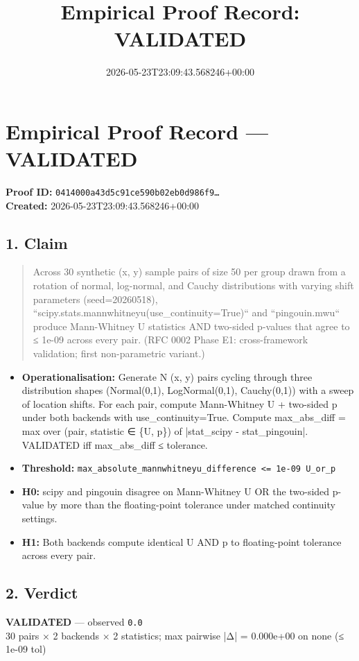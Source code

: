 \documentclass{article}
\title{Empirical Proof Record: VALIDATED}
\date{2026-05-23T23:09:43.568246+00:00}
\begin{document}
\maketitle
\section*{Empirical Proof Record --- \textcolor{validated}{\textbf{VALIDATED}}}
\textbf{Proof ID:} \texttt{0414000a43d5c91ce590b02eb0d986f9\dots}\\
\textbf{Created:} 2026-05-23T23:09:43.568246+00:00
\subsection*{1. Claim}
\begin{quote}Across 30 synthetic (x, y) sample pairs of size 50 per group drawn from a rotation of normal, log-normal, and Cauchy distributions with varying shift parameters (seed=20260518), ``scipy.stats.mannwhitneyu(use\_continuity=True)`` and ``pingouin.mwu`` produce Mann-Whitney U statistics AND two-sided p-values that agree to ≤ 1e-09 across every pair. (RFC 0002 Phase E1: cross-framework validation; first non-parametric variant.)\end{quote}
\begin{itemize}
\item \textbf{Operationalisation:} Generate N (x, y) pairs cycling through three distribution shapes (Normal(0,1), LogNormal(0,1), Cauchy(0,1)) with a sweep of location shifts. For each pair, compute Mann-Whitney U + two-sided p under both backends with use\_continuity=True. Compute max\_abs\_diff = max over (pair, statistic ∈ \{U, p\}) of |stat\_scipy - stat\_pingouin|. VALIDATED iff max\_abs\_diff ≤ tolerance.
\item \textbf{Threshold:} \texttt{max\_absolute\_mannwhitneyu\_difference <= 1e-09 U\_or\_p}
\item \textbf{H0:} scipy and pingouin disagree on Mann-Whitney U OR the two-sided p-value by more than the floating-point tolerance under matched continuity settings.
\item \textbf{H1:} Both backends compute identical U AND p to floating-point tolerance across every pair.
\end{itemize}
\subsection*{2. Verdict}
\textcolor{validated}{\textbf{VALIDATED}} --- observed \texttt{0.0}\\
30 pairs × 2 backends × 2 statistics; max pairwise |Δ| = 0.000e+00 on none (≤ 1e-09 tol)
\end{document}
